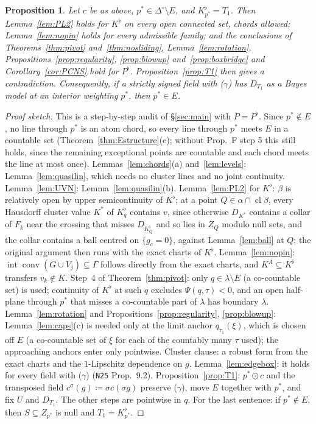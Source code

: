 \documentclass[11pt]{article}
\newtheorem{proposition}[theorem]{Proposition}
\theoremstyle{definition}
\theoremstyle{remark}
\newcommand{\Di}{\Delta^{\circ}}
\newcommand{\cl}{\operatorname{cl}}
\newcommand{\co}{\operatorname{conv}}
\newcommand{\src}[1]{\texttt{#1}}
\begin{document}
\begin{proposition}\label{prop:chainchords}
Let $c$ be as above, $p^*\in\Di\setminus E$, and $K^\flat_{p^*}=T_1$. Then Lemma~\ref{lem:PL2} holds for $K^\flat$ on every open connected set, chords allowed; Lemma~\ref{lem:nopin} holds for every admissible family; and the conclusions of Theorems~\ref{thm:pivot} and~\ref{thm:nosliding}, Lemma~\ref{lem:rotation}, Propositions~\ref{prop:regularity}, \ref{prop:blowup} and~\ref{prop:boxbridge} and Corollary~\ref{cor:PCNS} hold for $P^\flat$. Proposition~\ref{prop:T1} then gives a contradiction. Consequently, if a strictly signed field with ($\gamma$) has $D_{T_1}$ as a Bayes model at an interior weighting $p^*$, then $p^*\in E$.
\end{proposition}
\begin{proof}[Proof sketch]
This is a step-by-step audit of \S\ref{sec:main} with $P=P^\flat$. Since $p^*\notin E$, no line through $p^*$ is an atom chord, so every line through $p^*$ meets $E$ in a countable set (Theorem~\ref{thm:Estructure}(c); without Prop.~F step 5 this still holds, since the remaining exceptional points are countable and each chord meets the line at most once). Lemmas~\ref{lem:chords}(a) and~\ref{lem:levels}: Lemma~\ref{lem:quasilin}, which needs no cluster lines and no joint continuity. Lemma~\ref{lem:UVN}: Lemma~\ref{lem:quasilin}(b). Lemma~\ref{lem:PL2} for $K^\flat$: $\beta$ is relatively open by upper semicontinuity of $K^\flat$; at a point $Q\in\alpha\cap\cl\beta$, every Hausdorff cluster value $K^*$ of $K^\flat_q$ contains $v$, since otherwise $D_{K^*}$ contains a collar of $F_k$ near the crossing that misses $D_{K^\flat_Q}$ and so lies in $Z_Q$ modulo null sets, and the collar contains a ball centred on $\{g_c=0\}$, against Lemma~\ref{lem:ball} at $Q$; the original argument then runs with the exact charts of $K^\flat$. Lemma~\ref{lem:nopin}: $\operatorname{int}\co(G\cup V_j)\subseteq\Gamma$ follows directly from the exact charts, and $K^A\subseteq K^\flat$ transfers $v_k\notin K$. Step~4 of Theorem~\ref{thm:pivot}: only $q\in\lambda\setminus E$ (a co-countable set) is used; continuity of $K^\flat$ at such $q$ excludes $\Psi(q,\tau)<0$, and an open half-plane through $p^*$ that misses a co-countable part of $\lambda$ has boundary $\lambda$. Lemma~\ref{lem:rotation} and Propositions~\ref{prop:regularity}, \ref{prop:blowup}: Lemma~\ref{lem:caps}(c) is needed only at the limit anchor $q_{\tau_1}(\xi)$, which is chosen off $E$ (a co-countable set of $\xi$ for each of the countably many $\tau$ used); the approaching anchors enter only pointwise. Cluster clause: a robust form from the exact charts and the $1$-Lipschitz dependence on $g$. Lemma~\ref{lem:edgebox}: it holds for every field with ($\gamma$) (\src{N25} Prop.~9.2). Proposition~\ref{prop:T1}: $p^*\odot c$ and the transposed field $c^\sigma(g)\coloneqq\sigma c(\sigma g)$ preserve ($\gamma$), move $E$ together with $p^*$, and fix $U$ and $D_{T_1}$. The other steps are pointwise in $q$. For the last sentence: if $p^*\notin E$, then $S\subseteq Z_{p^*}$ is null and $T_1=K^\flat_{p^*}$.
\end{proof}
\end{document}
